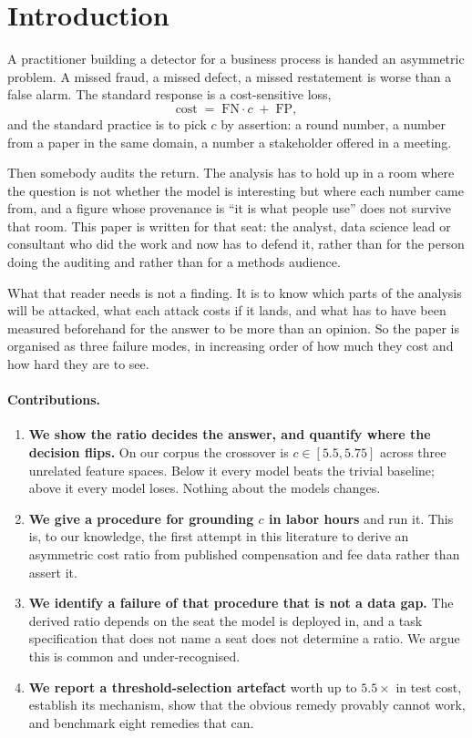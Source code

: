 \documentclass[11pt]{article}
\begin{document}
\section{Introduction}

A practitioner building a detector for a business process is handed an asymmetric problem. A
missed fraud, a missed defect, a missed restatement is worse than a false alarm. The standard
response is a cost-sensitive loss,
\[
\text{cost} \;=\; \mathrm{FN}\cdot c \;+\; \mathrm{FP},
\]
and the standard practice is to pick $c$ by assertion: a round number, a number from a paper in
the same domain, a number a stakeholder offered in a meeting.

Then somebody audits the return. The analysis has to hold up in a room where the question is
not whether the model is interesting but where each number came from, and a figure whose
provenance is ``it is what people use'' does not survive that room. This paper is written for
that seat: the analyst, data science lead or consultant who did the work and now has to defend
it, rather than for the person doing the auditing and rather than for a methods audience.

What that reader needs is not a finding. It is to know which parts of the analysis will be
attacked, what each attack costs if it lands, and what has to have been measured beforehand for
the answer to be more than an opinion. So the paper is organised as three failure modes, in
increasing order of how much they cost and how hard they are to see.

\paragraph{Contributions.}
\begin{enumerate}[label=(\arabic*)]
\item \textbf{We show the ratio decides the answer, and quantify where the decision flips.} On
our corpus the crossover is $c \in [5.5, 5.75]$ across three unrelated feature spaces. Below
it every model beats the trivial baseline; above it every model loses. Nothing about the
models changes.
\item \textbf{We give a procedure for grounding $c$ in labor hours} and run it. This is, to our
knowledge, the first attempt in this literature to derive an asymmetric cost ratio from
published compensation and fee data rather than assert it.
\item \textbf{We identify a failure of that procedure that is not a data gap.} The derived
ratio depends on the seat the model is deployed in, and a task specification that does not
name a seat does not determine a ratio. We argue this is common and under-recognised.
\item \textbf{We report a threshold-selection artefact} worth up to $5.5\times$ in test cost,
establish its mechanism, show that the obvious remedy provably cannot work, and benchmark eight
remedies that can.
\end{enumerate}
\end{document}
